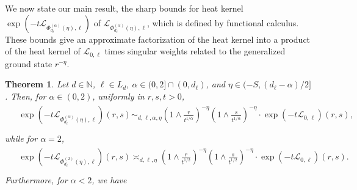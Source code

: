 \documentclass[12pt,reqno]{amsart}
\newtheorem{theorem}{Theorem}[section]
\theoremstyle{definition}
\theoremstyle{remark}
\numberwithin{equation}{section}
\newcommand{\1}{\mathbbm{1}}
\newcommand{\N}{\mathbb{N}}
\def\bs{\mathbb{S}}
\def\cl{\mathcal{L}}
\newcommand{\me}[1]{\mathrm{e}^{#1}}
\begin{document}
\smallskip
We now state our main result, the sharp bounds for heat kernel $\exp\left(-t\cl_{\Phi_{d_\ell}^{(\alpha)}(\eta),\ell}\right)$ of $\cl_{\Phi_{d_\ell}^{(\alpha)}(\eta),\ell}$, which is defined by functional calculus. These bounds give an approximate factorization of the heat kernel into a product of the heat kernel of $\cl_{0,\ell}$ times singular weights related to the generalized ground state $r^{-\eta}$.
\begin{theorem}
  \label{mainresult}
  Let $d\in\N$, $\ell\in L_d$, $\alpha\in(0,2]\cap(0,d_\ell)$, and $\eta\in(-S,(d_\ell-\alpha)/2]$.
  Then, for $\alpha\in(0,2)$, uniformly in $r,s,t>0$,
  \begin{align}
    \label{eq:mainresultalpha}
    \begin{split}
      & \exp\left(-t\cl_{\Phi_{d_\ell}^{(\alpha)}(\eta),\ell}\right)(r,s)
        \sim_{d,\ell,\alpha,\eta} \left(1\wedge\frac{r}{t^{1/\alpha}}\right)^{-\eta} \left(1\wedge\frac{s}{t^{1/\alpha}}\right)^{-\eta} \cdot \exp\left(-t\cl_{0,\ell}\right)(r,s), \\
    \end{split}
  \end{align}
  while for $\alpha=2$, 
  \begin{align}
    \label{eq:mainresult2}
    \begin{split}
      & \exp\left(-t\cl_{\Phi_{d_\ell}^{(2)}(\eta),\ell}\right)(r,s)
        \asymp_{d,\ell,\eta} \left(1\wedge\frac{r}{t^{1/2}}\right)^{-\eta} \left(1\wedge\frac{s}{t^{1/2}}\right)^{-\eta} \cdot \exp\left(-t\cl_{0,\ell}\right)(r,s). \\
     \end{split}
  \end{align}
  Furthermore, for $\alpha<2$, we have
  \begin{align}
    \label{eq:mainresultfreealpha}
    \begin{split}

\end{split}
\end{align}
\end{theorem}
\end{document}

